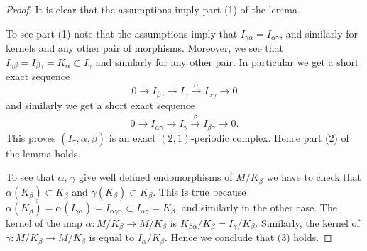 \documentclass[10pt,a4paper]{amsart}
\theoremstyle{plain}
\theoremstyle{definition}
\theoremstyle{remark}
\numberwithin{equation}{subsection}
\begin{document}
\begin{proof}
It is clear that the assumptions imply part (1) of the lemma.

\medskip\noindent
To see part (1) note that the assumptions imply that
$I_{\gamma\alpha} = I_{\alpha\gamma}$, and similarly for kernels
and any other pair of morphisms.
Moreover, we see that
$I_{\gamma\beta} =I_{\beta\gamma} = K_\alpha \subset I_\gamma$ and
similarly for any other pair. In particular we get a short exact sequence
$$
0 \to I_{\beta\gamma} \to I_\gamma \xrightarrow{\alpha} I_{\alpha\gamma} \to 0
$$
and similarly we get a short exact sequence
$$
0 \to I_{\alpha\gamma} \to I_\gamma \xrightarrow{\beta} I_{\beta\gamma} \to 0.
$$
This proves $(I_\gamma, \alpha, \beta)$ is an exact $(2, 1)$-periodic
complex. Hence part (2) of the lemma holds.

\medskip\noindent
To see that $\alpha$, $\gamma$ give well defined endomorphisms
of $M/K_\beta$ we have to check that $\alpha(K_\beta) \subset K_\beta$
and $\gamma(K_\beta) \subset K_\beta$. This is true because
$\alpha(K_\beta) = \alpha(I_{\gamma\alpha}) = I_{\alpha\gamma\alpha}
\subset I_{\alpha\gamma} = K_\beta$, and similarly in the other case.
The kernel of the map $\alpha : M/K_\beta \to M/K_\beta$ is
$K_{\beta\alpha}/K_\beta = I_\gamma/K_\beta$. Similarly,
the kernel of $\gamma : M/K_\beta \to M/K_\beta$ is equal to
$I_\alpha/K_\beta$. Hence we conclude that (3) holds.


\end{proof}
\end{document}
